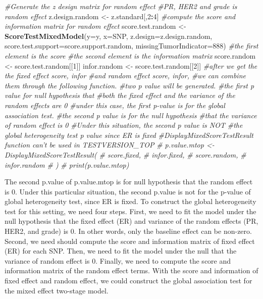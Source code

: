 \documentclass[11pt,]{article}
\newenvironment{Shaded}{\begin{snugshade}}{\end{snugshade}}
\newcommand{\KeywordTok}[1]{\textcolor[rgb]{0.13,0.29,0.53}{\textbf{#1}}}
\newcommand{\DataTypeTok}[1]{\textcolor[rgb]{0.13,0.29,0.53}{#1}}
\newcommand{\DecValTok}[1]{\textcolor[rgb]{0.00,0.00,0.81}{#1}}
\newcommand{\StringTok}[1]{\textcolor[rgb]{0.31,0.60,0.02}{#1}}
\newcommand{\CommentTok}[1]{\textcolor[rgb]{0.56,0.35,0.01}{\textit{#1}}}
\newcommand{\OperatorTok}[1]{\textcolor[rgb]{0.81,0.36,0.00}{\textbf{#1}}}
\newcommand{\NormalTok}[1]{#1}
\begin{document}
\begin{Shaded}
\begin{Highlighting}[]
\CommentTok{#Generate the z design matrix for random effect}
\CommentTok{#PR, HER2 and grade is random effect}
\NormalTok{z.design.random <-}\StringTok{ }\NormalTok{z.standard[,}\DecValTok{2}\OperatorTok{:}\DecValTok{4}\NormalTok{]}
\CommentTok{#compute the score and information matrix for random effect}
\NormalTok{score.test.random <-}\StringTok{ }\KeywordTok{ScoreTestMixedModel}\NormalTok{(}\DataTypeTok{y=}\NormalTok{y,}
                                         \DataTypeTok{x=}\NormalTok{SNP,}
                                         \DataTypeTok{z.design=}\NormalTok{z.design.random,}
                                         \DataTypeTok{score.test.support=}\NormalTok{score.support.random,}
                                         \DataTypeTok{missingTumorIndicator=}\DecValTok{888}\NormalTok{)}
\CommentTok{#the first element is the score}
\CommentTok{#the second element is the information matrix}
\NormalTok{score.random <-}\StringTok{ }\NormalTok{score.test.random[[}\DecValTok{1}\NormalTok{]]}
\NormalTok{infor.random <-}\StringTok{ }\NormalTok{score.test.random[[}\DecValTok{2}\NormalTok{]]}
\CommentTok{#after we get the the fixed effect score, infor }
\CommentTok{#and random effect score, infor, }
\CommentTok{#we can combine them through the following function. }
\CommentTok{#two p value will be generated.}
\CommentTok{#the first p value for null hypothesis that}
\CommentTok{#both the fixed effect and the variance of the random effects are 0}
\CommentTok{#under this case, the first p-value is for the global association test.}
\CommentTok{#the second p value is for the null hypothesis }
\CommentTok{#that the variance of random effect is 0}
\CommentTok{#Under this situation, the second p value is NOT }
\CommentTok{#the global heterogeneity test p value since ER is fixed}
\CommentTok{#DisplayMixedScoreTestResult function can't be used in TESTVERSION_TOP}
\CommentTok{# p.value.mtop <- DisplayMixedScoreTestResult(}
\CommentTok{#   score.fixed,}
\CommentTok{#   infor.fixed,}
\CommentTok{#   score.random,}
\CommentTok{#   infor.random}
\CommentTok{# )  }
\CommentTok{# print(p.value.mtop)}
\end{Highlighting}
\end{Shaded}

The second p.value of p.value.mtop is for null hypothesis that the
random effect is 0. Under this particular situation, the second p.value
is not for the p-value of global heterogeneity test, since ER is fixed.
To construct the global heterogeneity test for this setting, we need
four steps. First, we need to fit the model under the null hypothesis
that the fixed effect (ER) and variance of the random effects (PR, HER2,
and grade) is 0. In other words, only the baseline effect can be
non-zero. Second, we need should compute the score and information
matrix of fixed effect (ER) for each SNP. Then, we need to fit the model
under the null that the variance of random effect is 0. Finally, we need
to compute the score and information matrix of the random effect terms.
With the score and information of fixed effect and random effect, we
could construct the global association test for the mixed effect
two-stage model.
\end{document}
